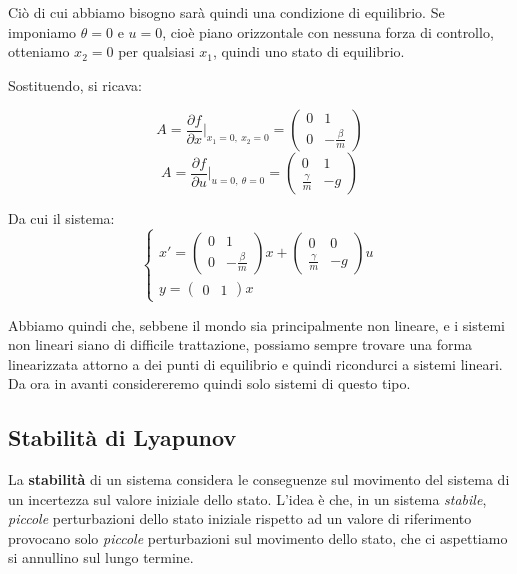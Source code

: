 \documentclass[a4paper,11pt]{article}
\begin{document}
Ciò di cui abbiamo bisogno sarà quindi una condizione di equilibrio.
Se imponiamo $\theta = 0$ e $u = 0$, cioè piano orizzontale con nessuna forza di controllo, otteniamo $x_2 = 0$ per qualsiasi $x_1$, quindi uno stato di equilibrio.

Sostituendo, si ricava:

$$
A = \frac{\partial f}{\partial x} \Bigg|_{x_1 = 0, \ x_2 = 0} = \begin{pmatrix}
	0 & 1 \\ 
	0 & -\frac{\beta}{m}
\end{pmatrix}
$$
$$
A = \frac{\partial f}{\partial u} \Bigg|_{u = 0, \ \theta = 0} = \begin{pmatrix}
	0 & 1 \\ 
	\frac{\gamma}{m} & -g
\end{pmatrix}
$$

Da cui il sistema:
\[
	\begin{cases}			
x' = \begin{pmatrix}
	0 & 1 \\ 
	0 & -\frac{\beta}{m}
\end{pmatrix} x + \begin{pmatrix}
	0 & 0 \\ 
	\frac{\gamma}{m} & -g
\end{pmatrix} u \\ 
y = \begin{pmatrix}
	0 & 1
\end{pmatrix} x
	\end{cases}
\]

\par\smallskip

Abbiamo quindi che, sebbene il mondo sia principalmente non lineare, e i sistemi non lineari siano di difficile trattazione, possiamo sempre trovare una forma linearizzata attorno a dei punti di equilibrio e quindi ricondurci a sistemi lineari.
Da ora in avanti considereremo quindi solo sistemi di questo tipo.

\subsection{Stabilità di Lyapunov}
La \textbf{stabilità} di un sistema considera le conseguenze sul movimento del sistema di un incertezza sul valore iniziale dello stato.
L'idea è che, in un sistema \textit{stabile}, \textit{piccole} perturbazioni dello stato iniziale rispetto ad un valore di riferimento provocano solo \textit{piccole} perturbazioni sul movimento dello stato, che ci aspettiamo si annullino sul lungo termine.
\end{document}
